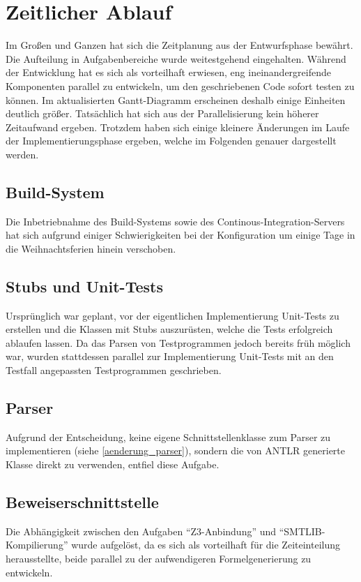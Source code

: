 \section{Zeitlicher Ablauf}

Im Großen und Ganzen hat sich die Zeitplanung aus der Entwurfsphase bewährt. Die Aufteilung in Aufgabenbereiche wurde weitestgehend eingehalten. Während der Entwicklung hat es sich als vorteilhaft erwiesen, eng ineinandergreifende Komponenten parallel zu entwickeln, um den geschriebenen Code sofort testen zu können. Im aktualisierten Gantt-Diagramm erscheinen deshalb einige Einheiten deutlich größer. Tatsächlich hat sich aus der Parallelisierung kein höherer Zeitaufwand ergeben. Trotzdem haben sich einige kleinere Änderungen im Laufe der Implementierungsphase ergeben, welche im Folgenden genauer dargestellt werden.

\subsection{Build-System}
Die Inbetriebnahme des Build-Systems sowie des Continous-Integration-Servers hat sich aufgrund einiger Schwierigkeiten bei der Konfiguration um einige Tage in die Weihnachtsferien hinein verschoben.

\subsection{Stubs und Unit-Tests}
Ursprünglich war geplant, vor der eigentlichen Implementierung Unit-Tests zu erstellen und die Klassen mit Stubs auszurüsten, welche die Tests erfolgreich ablaufen lassen. Da das Parsen von Testprogrammen jedoch bereits früh möglich war, wurden stattdessen parallel zur Implementierung Unit-Tests mit an den Testfall angepassten Testprogrammen geschrieben.

\subsection{Parser}
Aufgrund der Entscheidung, keine eigene Schnittstellenklasse zum Parser zu implementieren (siehe \ref{aenderung_parser}), sondern die von ANTLR generierte Klasse direkt zu verwenden, entfiel diese Aufgabe.

\subsection{Beweiserschnittstelle}
Die Abhängigkeit zwischen den Aufgaben "`Z3-Anbindung"' und "`SMTLIB-Kompilierung"' wurde aufgelöst, da es sich als vorteilhaft für die Zeiteinteilung herausstellte, beide parallel zu der aufwendigeren Formelgenerierung zu entwickeln.


